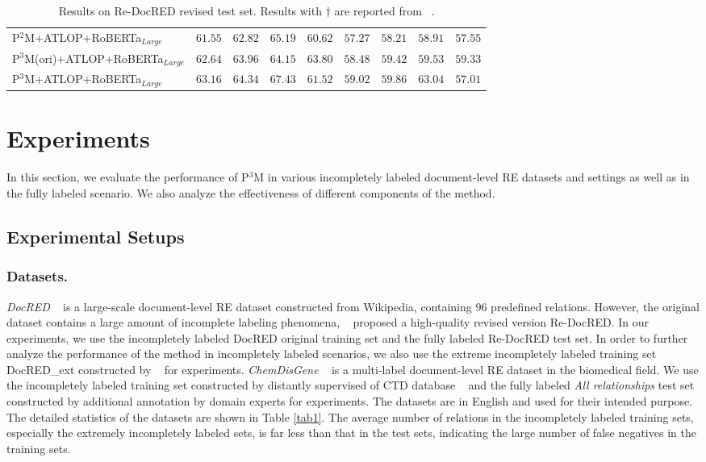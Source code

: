 \documentclass[letterpaper]{article} %
\begin{document}
\begin{table}[!ht]
\begin{tabular}{lcccc|cccc}
P$^{2}$M+ATLOP+RoBERTa$_{Large}$ & $61.55$ & $62.82$ & $65.19$ & $60.62$ & $57.27$ & $58.21$ & $58.91$ & $57.55$ \\
P$^{3}$M(ori)+ATLOP+RoBERTa$_{Large}$ & $62.64$ & $63.96$ & $64.15$ & $\mathbf{63.80}$ & $58.48$ & $59.42$ & $59.53$ & $59.33$ \\
P$^{3}$M+ATLOP+RoBERTa$_{Large}$ & $\mathbf{63.16}$ & $\mathbf{64.34}$ & $67.43$ & $61.52$ & $\mathbf{59.02}$ & $\mathbf{59.86}$ & $63.04$ & $57.01$ \\
\bottomrule
\end{tabular}
\caption{
Results on Re-DocRED revised test set. Results with $\dagger$ are reported from ~\cite{DBLP:conf/emnlp/WangLHZ22}.
}
\label{tab2}
\end{table}

\section{Experiments}
In this section, we evaluate the performance of P$^{3}$M in various incompletely labeled document-level RE datasets and settings as well as in the fully labeled scenario. We also analyze the effectiveness of different components of the method.

\subsection{Experimental Setups}

\subsubsection{Datasets.}
\emph{DocRED} ~\cite{DBLP:conf/acl/YaoYLHLLLHZS19} is a large-scale document-level RE dataset constructed from Wikipedia, containing 96 predefined relations. However, the original dataset contains a large amount of incomplete labeling phenomena, ~\cite{DBLP:conf/emnlp/Tan0BNA22} proposed a high-quality revised version Re-DocRED. In our experiments, we use the incompletely labeled DocRED original training set and the fully labeled Re-DocRED test set. In order to further analyze the performance of the method in incompletely labeled scenarios, we also use the extreme incompletely labeled training set DocRED\_ext constructed by ~\cite{DBLP:conf/emnlp/WangLHZ22} for experiments. \enspace \emph{ChemDisGene} ~\cite{DBLP:conf/lrec/ZhangMTM22} is a multi-label document-level RE dataset in the biomedical field. We use the incompletely labeled training set constructed by distantly supervised of CTD database ~\cite{DBLP:journals/nar/DavisGJSWWM21} and the fully labeled \emph{All relationships} test set constructed by additional annotation by domain experts for experiments. \enspace The datasets are in English and used for their intended purpose. The detailed statistics of the datasets are shown in Table \ref{tab1}. The average number of relations in the incompletely labeled training sets, especially the extremely incompletely labeled sets, is far less than that in the test sets, indicating the large number of false negatives in the training sets.
\end{document}
